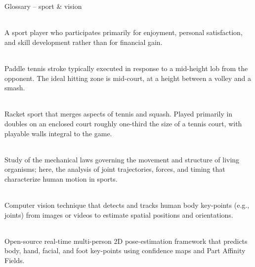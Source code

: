 \begin{frame}{Glossary -- sport \& vision}
\hypertarget{sub:appendix-glossary}{}%
\footnotesize
\begin{description}\setlength{\itemsep}{8pt}\setlength{\parsep}{0pt}
\item[\textbf{Amateur}]\hfill\\
A sport player who participates primarily for enjoyment, personal satisfaction, and skill development rather than for financial gain.

\item[\textbf{Bandeja}]\hfill\\
Paddle tennis stroke typically executed in response to a mid-height lob from the opponent. The ideal hitting zone is mid-court, at a height between a volley and a smash.

\item[\textbf{Paddle tennis} (padel)]\hfill\\
Racket sport that merges aspects of tennis and squash. Played primarily in doubles on an enclosed court roughly one-third the size of a tennis court, with playable walls integral to the game.

\item[\textbf{Biomechanics}]\hfill\\
Study of the mechanical laws governing the movement and structure of living organisms; here, the analysis of joint trajectories, forces, and timing that characterize human motion in sports.

\item[\textbf{Pose estimation}]\hfill\\
Computer vision technique that detects and tracks human body key-points (e.g., joints) from images or videos to estimate spatial positions and orientations.

\item[\textbf{OpenPose}]\hfill\\
Open-source real-time multi-person 2D pose-estimation framework that predicts body, hand, facial, and foot key-points using confidence maps and Part Affinity Fields.
\end{description}
\end{frame}

